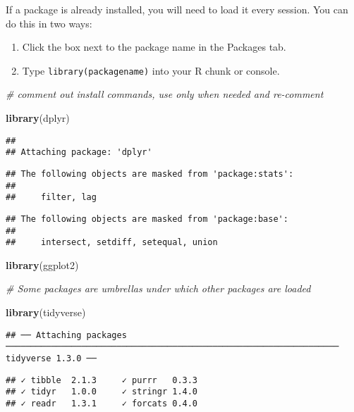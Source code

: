 \documentclass[]{article}
\newenvironment{Shaded}{\begin{snugshade}}{\end{snugshade}}
\newcommand{\KeywordTok}[1]{\textcolor[rgb]{0.13,0.29,0.53}{\textbf{#1}}}
\newcommand{\CommentTok}[1]{\textcolor[rgb]{0.56,0.35,0.01}{\textit{#1}}}
\newcommand{\NormalTok}[1]{#1}
\begin{document}
If a package is already installed, you will need to load it every
session. You can do this in two ways:

\begin{enumerate}
\def\labelenumi{\arabic{enumi}.}
\item
  Click the box next to the package name in the Packages tab.
\item
  Type \texttt{library(packagename)} into your R chunk or console.
\end{enumerate}

\begin{Shaded}
\begin{Highlighting}[]
\CommentTok{# comment out install commands, use only when needed and re-comment}

\KeywordTok{library}\NormalTok{(dplyr)}
\end{Highlighting}
\end{Shaded}

\begin{verbatim}
## 
## Attaching package: 'dplyr'
\end{verbatim}

\begin{verbatim}
## The following objects are masked from 'package:stats':
## 
##     filter, lag
\end{verbatim}

\begin{verbatim}
## The following objects are masked from 'package:base':
## 
##     intersect, setdiff, setequal, union
\end{verbatim}

\begin{Shaded}
\begin{Highlighting}[]
\KeywordTok{library}\NormalTok{(ggplot2)}



\CommentTok{# Some packages are umbrellas under which other packages are loaded}

\KeywordTok{library}\NormalTok{(tidyverse)}
\end{Highlighting}
\end{Shaded}

\begin{verbatim}
## ── Attaching packages ────────────────────────────────────────────────────────────────── tidyverse 1.3.0 ──
\end{verbatim}

\begin{verbatim}
## ✓ tibble  2.1.3     ✓ purrr   0.3.3
## ✓ tidyr   1.0.0     ✓ stringr 1.4.0
## ✓ readr   1.3.1     ✓ forcats 0.4.0
\end{verbatim}
\end{document}
